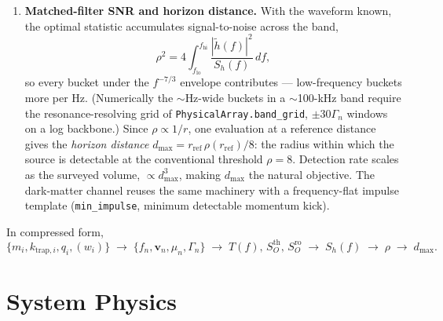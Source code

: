 \documentclass[11pt, letterpaper]{article}
\begin{document}
\begin{enumerate}[noitemsep]
        to the innermost-stable-circular-orbit cutoff
        $f_{\mathrm{ISCO}} = c^3/(6^{3/2}\pi G M_{\mathrm{tot}})$.
        Because $f_{\mathrm{ISCO}}$ scales inversely with mass,
        planetary-mass binaries are still inspiraling at
        10--300\,kHz --- essentially the only known GW source in the
        band where high-$Q$ levitated oscillators resonate.
  \item \textbf{Matched-filter SNR and horizon distance.}  With the
        waveform known, the optimal statistic accumulates
        signal-to-noise across the band,
        \begin{equation}
          \rho^2 = 4\int_{f_{\mathrm{lo}}}^{f_{\mathrm{hi}}}
            \frac{|\tilde h(f)|^2}{S_h(f)}\, df,
        \end{equation}
        so every bucket under the $f^{-7/3}$ envelope contributes ---
        low-frequency buckets more per Hz.  (Numerically the
        $\sim$Hz-wide buckets in a $\sim$100-kHz band require the
        resonance-resolving grid of
        \texttt{PhysicalArray.band\_grid}, $\pm 30\Gamma_n$ windows on
        a log backbone.)  Since $\rho \propto 1/r$, one evaluation at a
        reference distance gives the \emph{horizon distance}
        $d_{\max} = r_{\mathrm{ref}}\,\rho(r_{\mathrm{ref}})/8$: the
        radius within which the source is detectable at the
        conventional threshold $\rho = 8$.  Detection rate scales as
        the surveyed volume, $\propto d_{\max}^3$, making $d_{\max}$
        the natural objective.  The dark-matter channel reuses the same
        machinery with a frequency-flat impulse template
        (\texttt{min\_impulse}, minimum detectable momentum kick).
\end{enumerate}

\noindent In compressed form,
\begin{equation*}
  \{m_i, k_{\mathrm{trap},i}, q_i, (w_i)\}
  \;\longrightarrow\; \{f_n, \mathbf{v}_n, \mu_n, \Gamma_n\}
  \;\longrightarrow\; T(f),\, S_O^{\mathrm{th}},\, S_O^{\mathrm{ro}}
  \;\longrightarrow\; S_h(f)
  \;\longrightarrow\; \rho
  \;\longrightarrow\; d_{\max}.
\end{equation*}

\section{System Physics}
\end{document}
